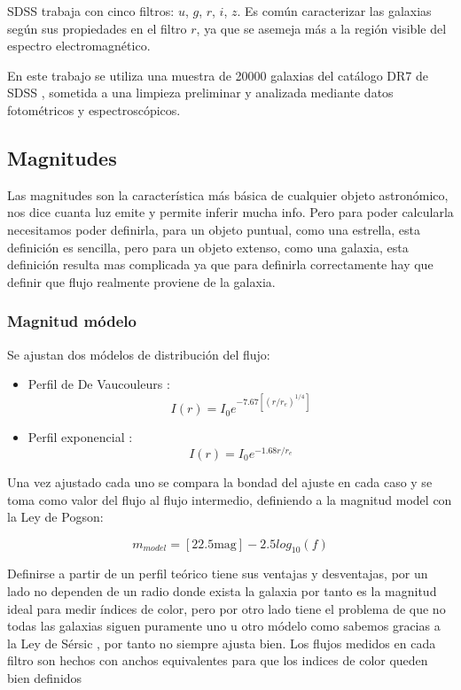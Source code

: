 \documentclass[twocolumn]{article}
\begin{document}
SDSS trabaja con cinco filtros: $u$, $g$, $r$, $i$, $z$. Es común caracterizar las galaxias según sus propiedades en el filtro $r$, ya que se asemeja más a la región visible del espectro electromagnético.

En este trabajo se utiliza una muestra de 20000 galaxias del catálogo DR7 de SDSS \citep{SDSSDR7}, sometida a una limpieza preliminar y analizada mediante datos fotométricos y espectroscópicos.




\subsection{Magnitudes}
Las magnitudes son la característica más básica de cualquier objeto astronómico, nos dice cuanta luz emite y permite inferir mucha info. Pero para poder calcularla necesitamos poder definirla, para un objeto puntual, como una estrella, esta definición es sencilla, pero para un objeto extenso, como una galaxia, esta definición resulta mas complicada ya que para definirla correctamente hay que definir que flujo realmente proviene de la galaxia.

\subsubsection{Magnitud módelo}
Se ajustan dos módelos de distribución del flujo:
\begin{itemize}
	\item Perfil de De Vaucouleurs \citep{1948AnAp...11..247D}:  
	\begin{equation}
        I(r) = I_0 e^{-7.67 [(r/r_e)^{1/4}]}
    \end{equation}
   
	\item Perfil exponencial \citep{1970ApJ...160..811F}:
	\begin{equation}
        I(r) = I_0 e^{-1.68r/r_e}
    \end{equation}
\end{itemize}

Una vez ajustado cada uno se compara la bondad del ajuste en cada caso y se toma como valor del flujo al flujo intermedio, definiendo a la magnitud model con la Ley de Pogson: 

\begin{equation}
m_{model}= [22.5 \text{mag}] - 2.5 log_{10} (f)
\end{equation}

Definirse a partir de un perfil teórico tiene sus ventajas y desventajas, por un lado no dependen de un radio donde exista la galaxia por tanto es la magnitud ideal para medir índices de color, pero por otro lado tiene el problema de que no todas las galaxias siguen puramente uno u otro módelo como sabemos gracias a la Ley de Sérsic \citep{1963BAAA....6...41S}, por tanto no siempre ajusta bien.
Los flujos medidos en cada filtro son hechos con anchos equivalentes para que los indices de color queden bien definidos
\end{document}

